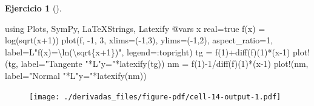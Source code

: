 \documentclass[
  a4paper,
]{scrreport}
\newenvironment{Shaded}{\begin{snugshade}}{\end{snugshade}}
\newcommand{\BuiltInTok}[1]{\textcolor[rgb]{0.00,0.23,0.31}{#1}}
\newcommand{\ConstantTok}[1]{\textcolor[rgb]{0.56,0.35,0.01}{#1}}
\newcommand{\FloatTok}[1]{\textcolor[rgb]{0.68,0.00,0.00}{#1}}
\newcommand{\FunctionTok}[1]{\textcolor[rgb]{0.28,0.35,0.67}{#1}}
\newcommand{\ImportTok}[1]{\textcolor[rgb]{0.00,0.46,0.62}{#1}}
\newcommand{\NormalTok}[1]{\textcolor[rgb]{0.00,0.23,0.31}{#1}}
\newcommand{\OperatorTok}[1]{\textcolor[rgb]{0.37,0.37,0.37}{#1}}
\newcommand{\PreprocessorTok}[1]{\textcolor[rgb]{0.68,0.00,0.00}{#1}}
\newcommand{\StringTok}[1]{\textcolor[rgb]{0.13,0.47,0.30}{#1}}
\theoremstyle{definition}
\newtheorem{exercise}{Ejercicio}[chapter]
\theoremstyle{remark}
\begin{document}
\begin{exercise}[]
\begin{tcolorbox}
\begin{Shaded}
\begin{Highlighting}[]
\ImportTok{using} \BuiltInTok{Plots}\NormalTok{, }\BuiltInTok{SymPy}\NormalTok{, }\BuiltInTok{LaTeXStrings}\NormalTok{, }\BuiltInTok{Latexify}
\PreprocessorTok{@vars}\NormalTok{ x real}\OperatorTok{=}\ConstantTok{true}
\FunctionTok{f}\NormalTok{(x) }\OperatorTok{=} \FunctionTok{log}\NormalTok{(}\FunctionTok{sqrt}\NormalTok{(x}\OperatorTok{+}\FloatTok{1}\NormalTok{))}
\FunctionTok{plot}\NormalTok{(f, }\OperatorTok{{-}}\FloatTok{1}\NormalTok{, }\FloatTok{3}\NormalTok{, xlims}\OperatorTok{=}\NormalTok{(}\OperatorTok{{-}}\FloatTok{1}\NormalTok{,}\FloatTok{3}\NormalTok{), ylims}\OperatorTok{=}\NormalTok{(}\OperatorTok{{-}}\FloatTok{1}\NormalTok{,}\FloatTok{2}\NormalTok{), aspect\_ratio}\OperatorTok{=}\FloatTok{1}\NormalTok{, label}\OperatorTok{=}\NormalTok{L}\StringTok{"f(x)=\textbackslash{}ln(\textbackslash{}sqrt\{x+1\})"}\NormalTok{, legend}\OperatorTok{=:}\NormalTok{topright)}
\NormalTok{tg }\OperatorTok{=} \FunctionTok{f}\NormalTok{(}\FloatTok{1}\NormalTok{)}\FunctionTok{+diff}\NormalTok{(f)(}\FloatTok{1}\NormalTok{)}\FunctionTok{*}\NormalTok{(x}\OperatorTok{{-}}\FloatTok{1}\NormalTok{)}
\FunctionTok{plot!}\NormalTok{(tg, label}\OperatorTok{=}\StringTok{"Tangente "}\OperatorTok{*}\NormalTok{L}\StringTok{"y="}\FunctionTok{*latexify}\NormalTok{(tg))}
\NormalTok{nm }\OperatorTok{=} \FunctionTok{f}\NormalTok{(}\FloatTok{1}\NormalTok{)}\OperatorTok{{-}}\FloatTok{1}\OperatorTok{/}\FunctionTok{diff}\NormalTok{(f)(}\FloatTok{1}\NormalTok{)}\FunctionTok{*}\NormalTok{(x}\OperatorTok{{-}}\FloatTok{1}\NormalTok{)}
\FunctionTok{plot!}\NormalTok{(nm, label}\OperatorTok{=}\StringTok{"Normal "}\OperatorTok{*}\NormalTok{L}\StringTok{"y="}\FunctionTok{*latexify}\NormalTok{(nm))}
\end{Highlighting}
\end{Shaded}

\begin{figure}[H]

{\centering \texttt{[image: ./derivadas\_files/figure-pdf/cell-14-output-1.pdf]}

}

\end{figure}

\end{tcolorbox}

\end{exercise}
\end{document}
